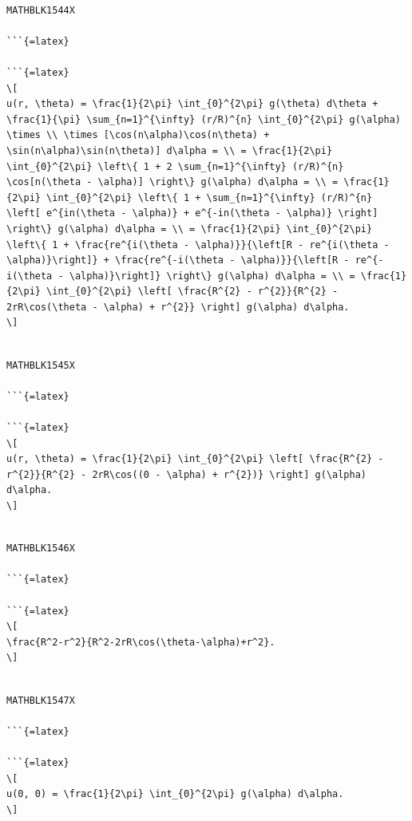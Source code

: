 \documentclass[
]{article}
\begin{document}
\begin{verbatim}

MATHBLK1544X

```{=latex}

```{=latex}
\[
u(r, \theta) = \frac{1}{2\pi} \int_{0}^{2\pi} g(\theta) d\theta + \frac{1}{\pi} \sum_{n=1}^{\infty} (r/R)^{n} \int_{0}^{2\pi} g(\alpha) \times \\ \times [\cos(n\alpha)\cos(n\theta) + \sin(n\alpha)\sin(n\theta)] d\alpha = \\ = \frac{1}{2\pi} \int_{0}^{2\pi} \left\{ 1 + 2 \sum_{n=1}^{\infty} (r/R)^{n} \cos[n(\theta - \alpha)] \right\} g(\alpha) d\alpha = \\ = \frac{1}{2\pi} \int_{0}^{2\pi} \left\{ 1 + \sum_{n=1}^{\infty} (r/R)^{n} \left[ e^{in(\theta - \alpha)} + e^{-in(\theta - \alpha)} \right] \right\} g(\alpha) d\alpha = \\ = \frac{1}{2\pi} \int_{0}^{2\pi} \left\{ 1 + \frac{re^{i(\theta - \alpha)}}{\left[R - re^{i(\theta - \alpha)}\right]} + \frac{re^{-i(\theta - \alpha)}}{\left[R - re^{-i(\theta - \alpha)}\right]} \right\} g(\alpha) d\alpha = \\ = \frac{1}{2\pi} \int_{0}^{2\pi} \left[ \frac{R^{2} - r^{2}}{R^{2} - 2rR\cos(\theta - \alpha) + r^{2}} \right] g(\alpha) d\alpha.
\]
\end{verbatim}

\begin{verbatim}

MATHBLK1545X

```{=latex}

```{=latex}
\[
u(r, \theta) = \frac{1}{2\pi} \int_{0}^{2\pi} \left[ \frac{R^{2} - r^{2}}{R^{2} - 2rR\cos((0 - \alpha) + r^{2})} \right] g(\alpha) d\alpha.
\]
\end{verbatim}

\begin{verbatim}

MATHBLK1546X

```{=latex}

```{=latex}
\[
\frac{R^2-r^2}{R^2-2rR\cos(\theta-\alpha)+r^2}.
\]
\end{verbatim}

\begin{verbatim}

MATHBLK1547X

```{=latex}

```{=latex}
\[
u(0, 0) = \frac{1}{2\pi} \int_{0}^{2\pi} g(\alpha) d\alpha.
\]
\end{verbatim}
\end{document}
